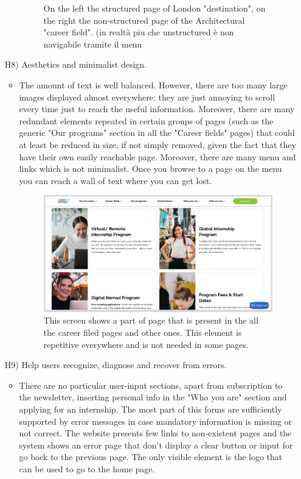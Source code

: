 \documentclass[11pt, letterpaper]{article}
\begin{document}
\begin{enumerate}
\begin{itemize}
\begin{figure}[H]
                    \caption{On the left the structured page of London "destination", on the right the non-structured page of the Architectural "career field". (in realtà piu che unstructured  è non navigabile tramite il menu}
                \end{figure}
            \end{itemize}
        \item[H8)] Aesthetics and minimalist design.
            \begin{itemize}
                \item The amount of text is well balanced. However, there are too many large images displayed almost everywhere: they are just annoying to scroll every time just to reach the useful information. Moreover, there are many redundant elements repeated in certain groups of pages (such as the generic "Our programs" section in all the "Career fields" pages) that could at least be reduced in size, if not simply removed, given the fact that they have their own easily reachable page. Moreover, there are many menu and links which is not minimalist. Once you browse to a page on the menu you can reach a wall of text where you can get lost.
                \begin{figure}[H]
                    \centering
                    \includegraphics[width=10cm]{images/inspection/H8.png}
                    \caption{This screen shows a part of page that is present in the all the career filed pages and other ones. This element is repetitive everywhere and is not needed in some pages.}
                \end{figure}
            \end{itemize}
        \item[H9)] Help users recognize, diagnose and recover from errors. 
            \begin{itemize}
                \item There are no particular user-input sections, apart from subscription to the newsletter, inserting personal info in the "Who you are" section and applying for an internship. The most part of this forms are sufficiently supported by error messages in case mandatory information is missing or not correct. The website presents few links to non-existent pages and the system shows an error page that don’t display a clear button or input for go back to the previous page. The only visible element is the logo that can be used to go to the home page. 

\end{itemize}
\end{enumerate}
\end{document}
